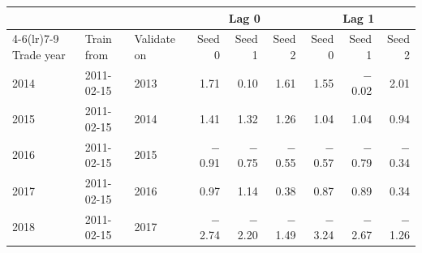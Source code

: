 \begin{tabular}{@{}lllrrrrrr@{}}
\toprule
 & & & \multicolumn{3}{c}{Lag 0} & \multicolumn{3}{c}{Lag 1}\\
\cmidrule(lr){4-6}\cmidrule(lr){7-9}
Trade year & Train from & Validate on & Seed 0 & Seed 1 & Seed 2 & Seed 0 & Seed 1 & Seed 2\\
\midrule
2014 & 2011-02-15 & 2013 & 1.71 & 0.10 & 1.61 & 1.55 & \ensuremath{-}0.02 & 2.01\\
2015 & 2011-02-15 & 2014 & 1.41 & 1.32 & 1.26 & 1.04 & 1.04 & 0.94\\
2016 & 2011-02-15 & 2015 & \ensuremath{-}0.91 & \ensuremath{-}0.75 & \ensuremath{-}0.55 & \ensuremath{-}0.57 & \ensuremath{-}0.79 & \ensuremath{-}0.34\\
2017 & 2011-02-15 & 2016 & 0.97 & 1.14 & 0.38 & 0.87 & 0.89 & 0.34\\
2018 & 2011-02-15 & 2017 & \ensuremath{-}2.74 & \ensuremath{-}2.20 & \ensuremath{-}1.49 & \ensuremath{-}3.24 & \ensuremath{-}2.67 & \ensuremath{-}1.26\\
\bottomrule
\end{tabular}
